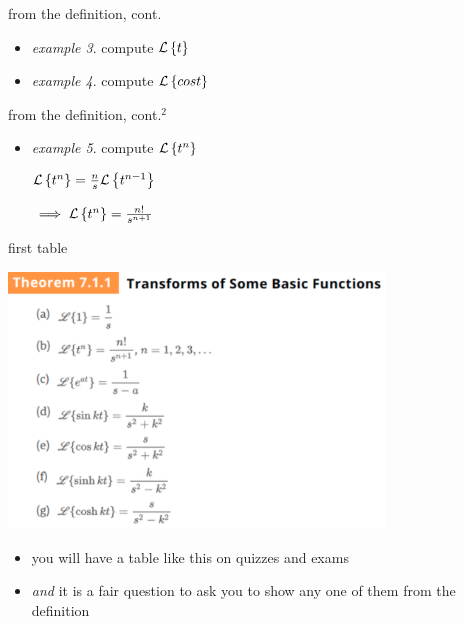 \documentclass[urlcolor=blue,dvipsnames]{beamer}
\begin{document}
\begin{frame}{from the definition, cont.}

\begin{itemize}
\item \emph{example 3}.  compute $\mathcal{L}\left\{t\right\}$

\vspace{30mm}
\item \emph{example 4}.  compute $\mathcal{L}\left\{cos t\right\}$

\vspace{35mm}
\end{itemize}
\end{frame}


\begin{frame}{from the definition, cont.$^2$}

\begin{itemize}
\item \emph{example 5}.  compute $\mathcal{L}\left\{t^n\right\}$

\vspace{50mm}
\hfill $\begin{matrix}
        \mathcal{L}\left\{t^n\right\} = \frac{n}{s} \mathcal{L}\left\{t^{n-1}\right\} \\ \\
        \implies \mathcal{L}\left\{t^n\right\} = \frac{n!}{s^{n+1}}
        \end{matrix}$
\end{itemize}
\end{frame}


\begin{frame}{first table}

\begin{center}
\includegraphics[width=0.75\textwidth]{figs/laplacetable.pdf}
\end{center}

\vspace{-4mm}
\begin{itemize}
\item you will have a table like this on quizzes and exams
\item \emph{and} it is a fair question to ask you to show any one of them from the definition
\end{itemize}
\end{frame}
\end{document}
